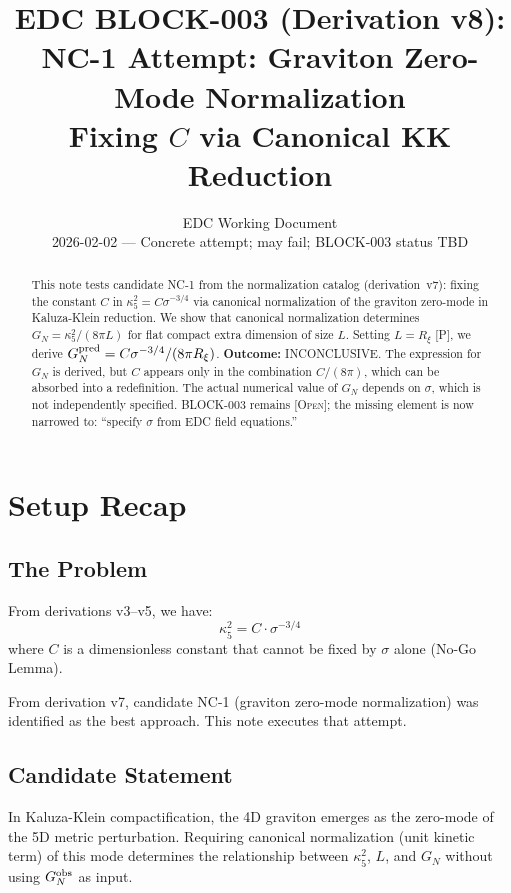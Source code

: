 \documentclass[11pt,a4paper]{article}
\title{\textbf{EDC BLOCK-003 (Derivation v8):}\\[0.3em]
NC-1 Attempt: Graviton Zero-Mode Normalization\\[0.3em]
\large Fixing $C$ via Canonical KK Reduction}
\author{EDC Working Document\\[0.5em]
\small 2026-02-02 --- Concrete attempt; may fail; BLOCK-003 status TBD}
\date{}
\newcommand{\Post}{\textsc{[P]}}
\newcommand{\Open}{\textsc{[Open]}}
\begin{document}
\maketitle

\begin{abstract}
This note tests candidate NC-1 from the normalization catalog (derivation~v7):
fixing the constant $C$ in $\kappa_5^2 = C \sigma^{-3/4}$ via canonical
normalization of the graviton zero-mode in Kaluza-Klein reduction.
We show that canonical normalization determines $G_N = \kappa_5^2 / (8\pi L)$
for flat compact extra dimension of size $L$. Setting $L = R_\xi$ \Post,
we derive $G_N^{\rm pred} = C \sigma^{-3/4} / (8\pi R_\xi)$.
\textbf{Outcome:} INCONCLUSIVE. The expression for $G_N$ is derived, but
$C$ appears only in the combination $C / (8\pi)$, which can be absorbed
into a redefinition. The actual numerical value of $G_N$ depends on
$\sigma$, which is not independently specified. BLOCK-003 remains \Open;
the missing element is now narrowed to: ``specify $\sigma$ from EDC
field equations.''
\end{abstract}

\tableofcontents
\newpage

\section{Setup Recap}

\subsection{The Problem}

From derivations v3--v5, we have:
\begin{equation}
\kappa_5^2 = C \cdot \sigma^{-3/4}
\label{eq:kappa_c}
\end{equation}
where $C$ is a dimensionless constant that cannot be fixed by $\sigma$ alone
(No-Go Lemma).

From derivation v7, candidate NC-1 (graviton zero-mode normalization) was
identified as the best approach. This note executes that attempt.

\subsection{Candidate Statement}

\begin{statusbox}
In Kaluza-Klein compactification, the 4D graviton emerges as the zero-mode
of the 5D metric perturbation. Requiring canonical normalization (unit
kinetic term) of this mode determines the relationship between $\kappa_5^2$,
$L$, and $G_N$ without using $G_N^{\rm obs}$ as input.
\end{statusbox}
\end{document}
